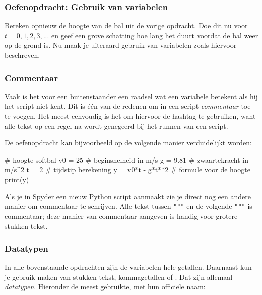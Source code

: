 \documentclass[a4paper,11pt, fleqn]{article}
\begin{document}
\subsubsection*{Oefenopdracht: Gebruik van variabelen} Bereken opnieuw de hoogte van de bal uit de vorige opdracht. Doe dit nu voor $t = 0,1,2,3, ... $ en geef een grove schatting hoe lang het duurt voordat de bal weer op de grond is. Nu maak je uiteraard gebruik van variabelen zoals hiervoor beschreven.

\subsubsection{Commentaar}
Vaak is het voor een buitenstaander een raadsel wat een variabele betekent als hij het script niet kent. 
Dit is \'e\'en van de redenen om in een script \textit{commentaar} toe te voegen. 
Het meest eenvoudig is het om hiervoor de hashtag te gebruiken, want alle tekst op een regel na \pythoninline{#} wordt genegeerd bij het runnen van een script. 

De oefenopdracht kan bijvoorbeeld op de volgende manier verduidelijkt worden:
\begin{python}
# hoogte softbal
v0 = 25	   # beginsnelheid in m/s
g  = 9.81  # zwaartekracht in m/s^2
t  = 2	   # tijdstip berekening
y = v0*t - g*t**2 # formule voor de hoogte
print(y)
\end{python}
Als je in Spyder een nieuw Python script aanmaakt zie je direct nog een andere manier om commentaar te schrijven. Alle tekst tussen \verb,""", en de volgende \verb,""", is commentaar; deze manier van commentaar aangeven is handig voor grotere stukken tekst. 

\subsubsection{Datatypen}
In alle bovenstaande opdrachten zijn de variabelen hele getallen. Daarnaast kun je gebruik maken van stukken tekst, kommagetallen of . Dat zijn allemaal {\it datatypen}. Hieronder de meest gebruikte, met hun offici\"ele naam:
\end{document}
